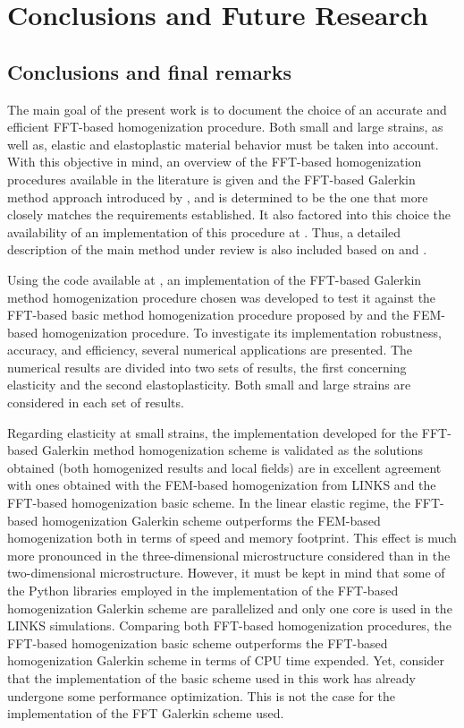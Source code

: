 \chapter{Conclusions and Future Research}

\section{Conclusions and final remarks}

The main goal of the present work is to document the choice of an accurate and efficient FFT-based homogenization procedure.
Both small and large strains, as well as, elastic and elastoplastic material behavior must be taken into account.
With this objective in mind, an overview of the FFT-based homogenization procedures available in the literature is given and the FFT-based Galerkin method approach introduced by \cite{vondrejc_fft-based_2014}, \cite{zeman_finite_2017} and \cite{de_geus_finite_2017} is determined to be the one that more closely matches the requirements established.
It also factored into this choice the availability of an implementation of this procedure at \cite{}.
Thus, a detailed description of the main method under review is also included based on \cite{zeman_finite_2017} and \cite{de_geus_finite_2017}.

Using the code available at \cite{}, an implementation of the FFT-based Galerkin method homogenization procedure chosen was developed to test it against the FFT-based basic method homogenization procedure proposed by \cite{moulinec_fast_1994} and the FEM-based homogenization procedure.
To investigate its implementation robustness, accuracy, and efficiency, several numerical applications are presented.
The numerical results are divided into two sets of results, the first concerning elasticity and the second elastoplasticity.
Both small and large strains are considered in each set of results.

Regarding elasticity at small strains, the implementation developed for the FFT-based Galerkin method homogenization scheme is validated as the solutions obtained (both homogenized results and local fields) are in excellent agreement with ones obtained with the FEM-based homogenization from LINKS and the FFT-based homogenization basic scheme.
In the linear elastic regime, the FFT-based homogenization Galerkin scheme outperforms the FEM-based homogenization both in terms of speed and memory footprint.
This effect is much more pronounced in the three-dimensional microstructure considered than in the two-dimensional microstructure.
However, it must be kept in mind that some of the Python libraries employed in the implementation of the FFT-based homogenization Galerkin scheme are parallelized and only one core is used in the LINKS simulations.
Comparing both FFT-based homogenization procedures, the FFT-based homogenization basic scheme outperforms the FFT-based homogenization Galerkin scheme in terms of CPU time expended.
Yet, consider that the implementation of the basic scheme used in this work \citep{ferreira_accurate_2020} has already undergone some performance optimization.
This is not the case for the implementation of the FFT Galerkin scheme used.

